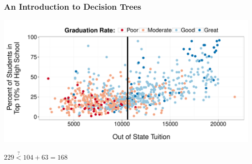 \documentclass{beamer}\usepackage[]{graphicx}\usepackage[]{color}
\makeatletter
\def\maxwidth{ %
  \ifdim\Gin@nat@width>\linewidth
    \linewidth
  \else
    \Gin@nat@width
  \fi
}
\newenvironment{knitrout}{}{} %
\makeatother
\begin{document}

\begin{frame}
\frametitle{An Introduction to Decision Trees}

\begin{knitrout}
\color{fgcolor}
\includegraphics[width=\maxwidth]{figure/grad_rate_best_split-1} 

\end{knitrout}

\vspace{2ex}

\centering
$229 \stackrel{?}{<} 104 + 63 = 168$

\end{frame}

\end{document}
